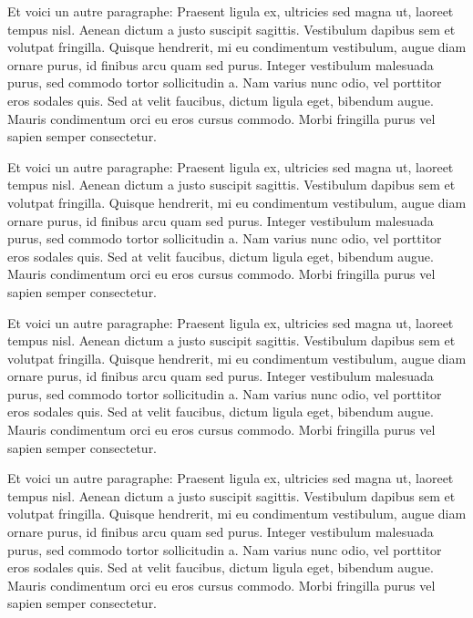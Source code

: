 \documentclass[11pt,compact]{lecture}
\begin{document}
\begin{example}[]{}
    Et voici un autre paragraphe: Praesent ligula ex, ultricies sed magna ut,
    laoreet tempus nisl. Aenean dictum a justo suscipit sagittis. Vestibulum dapibus
    sem et volutpat fringilla. Quisque hendrerit, mi eu condimentum vestibulum,
    augue diam ornare purus, id finibus arcu quam sed purus. Integer vestibulum
    malesuada purus, sed commodo tortor sollicitudin a. Nam varius nunc odio, vel
    porttitor eros sodales quis. Sed at velit faucibus, dictum ligula eget, bibendum
    augue. Mauris condimentum orci eu eros cursus commodo. Morbi fringilla purus vel
    sapien semper consectetur.

    Et voici un autre paragraphe: Praesent ligula ex, ultricies sed magna ut,
    laoreet tempus nisl. Aenean dictum a justo suscipit sagittis. Vestibulum dapibus
    sem et volutpat fringilla. Quisque hendrerit, mi eu condimentum vestibulum,
    augue diam ornare purus, id finibus arcu quam sed purus. Integer vestibulum
    malesuada purus, sed commodo tortor sollicitudin a. Nam varius nunc odio, vel
    porttitor eros sodales quis. Sed at velit faucibus, dictum ligula eget, bibendum
    augue. Mauris condimentum orci eu eros cursus commodo. Morbi fringilla purus vel
    sapien semper consectetur. 

    Et voici un autre paragraphe: Praesent ligula ex, ultricies sed magna ut,
    laoreet tempus nisl. Aenean dictum a justo suscipit sagittis. Vestibulum dapibus
    sem et volutpat fringilla. Quisque hendrerit, mi eu condimentum vestibulum,
    augue diam ornare purus, id finibus arcu quam sed purus. Integer vestibulum
    malesuada purus, sed commodo tortor sollicitudin a. Nam varius nunc odio, vel
    porttitor eros sodales quis. Sed at velit faucibus, dictum ligula eget, bibendum
    augue. Mauris condimentum orci eu eros cursus commodo. Morbi fringilla purus vel
    sapien semper consectetur. 

    Et voici un autre paragraphe: Praesent ligula ex, ultricies sed magna ut,
    laoreet tempus nisl. Aenean dictum a justo suscipit sagittis. Vestibulum dapibus
    sem et volutpat fringilla. Quisque hendrerit, mi eu condimentum vestibulum,
    augue diam ornare purus, id finibus arcu quam sed purus. Integer vestibulum
    malesuada purus, sed commodo tortor sollicitudin a. Nam varius nunc odio, vel
    porttitor eros sodales quis. Sed at velit faucibus, dictum ligula eget, bibendum
    augue. Mauris condimentum orci eu eros cursus commodo. Morbi fringilla purus vel
    sapien semper consectetur. 


\end{example}
\end{document}
